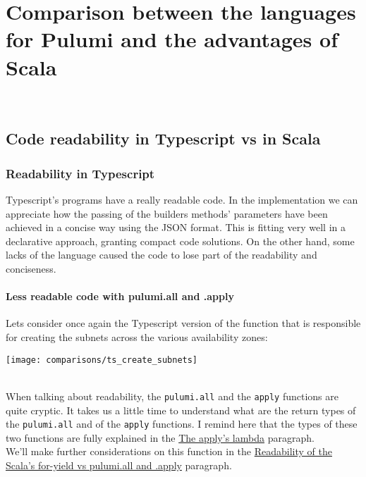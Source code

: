 
\chapter{Comparison between the languages for Pulumi and the advantages of Scala}
\label{cap:comparisons}

\\

\section{Code readability in Typescript vs in Scala}

\subsection{Readability in Typescript}
Typescript's programs have a really readable code.
In the implementation we can appreciate how the passing of the builders methods' parameters have been achieved in a concise way using the JSON format.
This is fitting very well in a declarative approach, granting compact code solutions. 
On the other hand, some lacks of the language caused the code to lose part of the readability and conciseness.\\

\subsubsection{Less readable code with pulumi.all and .apply}
\label{sssec:ts-subnets-comparison}
Lets consider once again the Typescript version of the function that is responsible for creating the subnets across the various availability zones:
\begin{center}
  \texttt{[image: comparisons/ts\_create\_subnets]} 
\end{center}\mbox{}\\
When talking about readability, the \texttt{pulumi.all} and the \texttt{apply} functions are quite cryptic.
It takes us a little time to understand what are the return types of the \texttt{pulumi.all} and of the \texttt{apply} functions.
I remind here that the types of these two functions are fully explained in the \hyperref[par:ts-lambda]{The apply's lambda} paragraph.\\
We'll make further considerations on this function in the \hyperref[sssec:readability-for-yield]{Readability of the Scala's for-yield vs pulumi.all and .apply} paragraph.

